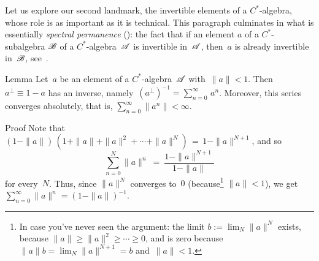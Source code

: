 \documentclass[a]{subfiles}
\begin{document}
%
%
\begin{parsec}%
\begin{point}%
Let us explore our second landmark,
the  invertible elements
of a $C^*$-algebra,
whose role 
is as important as it is technical.
This paragraph culminates in what is essentially
 \emph{spectral permanence} ():
the fact that if an element $a$ of a $C^*$-subalgebra $\mathscr{B}$
of a $C^*$-algebra~$\mathscr{A}$
is invertible in~$\mathscr{A}$,
then~$a$ is already invertible in~$\mathscr{B}$,
see~.
\end{point}
\begin{point}[geometric]{Lemma}%
%
Let~$a$ be an element of a $C^*$-algebra~$\mathscr{A}$ with~$\|a\|<1$.
Then~$a^\perp\equiv 1-a$ has an inverse,
namely~$(a^\perp)^{-1}= \sum_{n=0}^\infty\, a^n$.
Moreover, this series converges absolutely,
that is,
$\sum_{n=0}^\infty \|a^n\|<\infty$.
\begin{point}{Proof}%
Note that
$(1-\|a\|)\,(1+\|a\|+\|a\|^2+\dotsb+\|a\|^N) \,=\, 1-\|a\|^{N+1}$,
and so 
\begin{equation*}
\sum_{n=0}^N \|a\|^n \ =\  \frac{1-\|a\|^{N+1}}{1-\|a\|}
\end{equation*}
for every~$N$.
Thus,
since $\|a\|^N$ converges to~$0$
(because\footnote{
In case you've never seen the argument:
the limit $b:=\lim_N \|a\|^N$
exists, because $\|a\|\geq \|a\|^2\geq \dotsb\geq 0$,
and is zero
because $\|a\|b=\lim_N \|a\|^{N+1}=b$
and~$\|a\| < 1$.}
 $\|a\|<1$),
we  get $\sum_{n=0}^\infty \|a\|^n = (1-\|a\|)^{-1}$.


\end{point}
\end{point}
\end{parsec}
\end{document}

